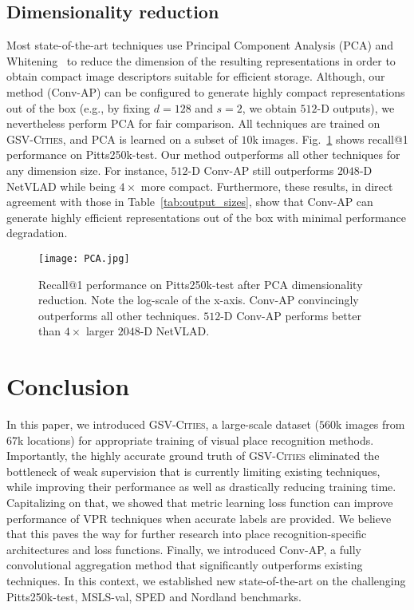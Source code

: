 \documentclass{article}
\begin{document}
\subsection{Dimensionality reduction}\label{sec:exp:pca}
Most state-of-the-art techniques use Principal Component Analysis (PCA) and Whitening~\cite{jegou2012negative} to reduce the dimension of the resulting representations in order to obtain compact image descriptors suitable for efficient storage. Although, our method (Conv-AP) can be configured to generate highly compact representations out of the box (e.g., by fixing $d=128$ and $s=2$, we obtain $512$-D outputs), we nevertheless perform PCA for fair comparison. All techniques are trained on \textsc{GSV-Cities}, and PCA is learned on a subset of $10$k images. Fig.~\ref{fig:PCA} shows recall@1 performance on Pitts250k-test. Our method outperforms all other techniques for any dimension size. For instance, $512$-D Conv-AP still outperforms $2048$-D NetVLAD while being $4\times$ more compact. Furthermore, these results, in direct agreement with those in Table~\ref{tab:output_sizes}, show that Conv-AP can generate highly efficient representations out of the box with minimal performance degradation.

\begin{figure}[tb]
      \centering
\texttt{[image: PCA.jpg]}
  \caption{Recall@1 performance on Pitts250k-test after PCA dimensionality reduction. Note the log-scale of the x-axis. Conv-AP convincingly outperforms all other techniques. $512$-D Conv-AP performs better than $4\times$ larger $2048$-D NetVLAD.}
      \label{fig:PCA}
\end{figure}

\section{Conclusion}
In this paper, we introduced \textsc{GSV-Cities}, a large-scale dataset ($560$k images from $67$k locations) for appropriate training of visual place recognition methods. Importantly, the highly accurate ground truth of \textsc{GSV-Cities} eliminated the bottleneck of weak supervision that is currently limiting existing techniques, while improving their performance as well as drastically reducing training time.
Capitalizing on that, we showed that metric learning loss function can improve performance of VPR techniques when accurate labels are provided. We believe that this paves the way for further research into place recognition-specific architectures and loss functions.
Finally, we introduced Conv-AP, a fully convolutional aggregation method that significantly outperforms existing techniques. In this context, we established new state-of-the-art on the challenging Pitts250k-test, MSLS-val, SPED and Nordland benchmarks.
\end{document}
